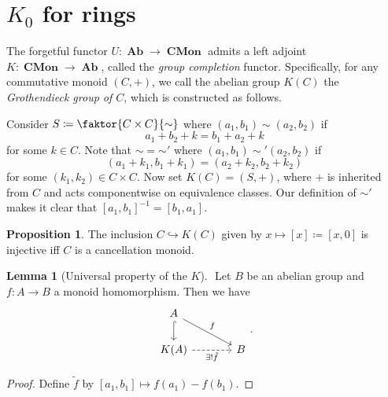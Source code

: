 \documentclass[10pt,letterpaper,cm]{nupset}
\theoremstyle{definition}
\theoremstyle{theorem}
\newtheorem{lemma}[definition]{Lemma}
\newtheorem{prop}[definition]{Proposition}
\theoremstyle{remark}
\newcommand{\1}{\mathbf{1}}
\newcommand{\0}{\vec 0}
\DeclareMathOperator{\Ab}{\mathbf{Ab}}
\DeclareMathOperator{\Cmon}{\mathbf{CMon}}
\begin{document}
\begin{abstract}
We begin low-dimensional $K$-theory, which consists of the groups $K_0(-)$, $K_1(-)$, and $K_2(-)$. Specifically, we describe $K_0$ for rings and for topological spaces. The main sources for this talk are the following.
\begin{itemize}
\item $n$Lab.
\item Charles Weibel's \textit{The $K$-book: an introduction to algebraic $K$-theory}, Chapters I and II.
\item Eric M. Friedlander's \textit{An Introduction to $K$-theory}, Chapter 1.
\end{itemize}
\end{abstract}

\smallskip

\section{$K_0$ for rings}

The forgetful functor $U: \Ab \to \Cmon$ admits a left adjoint $K: \Cmon \to \Ab$, called the \textit{group completion} functor. Specifically, for any commutative monoid $\left(C, +\right)$, we call the abelian group $K(C)$ the \textit{Grothendieck group of $C$}, which is constructed as follows.

\medskip

 Consider $S\coloneqq \faktor{C \times C}{\sim}$ where $(a_1, b_1) \sim (a_2, b_2)$ if $$a_1 + b_2 +k = b_1 + a_2 +k$$ for some $k\in C$. Note that $\sim = {\sim'}$ where $(a_1, b_1) \sim' (a_2, b_2)$ if $$\left(a_1 + k_1, b_1 + k_1\right) = \left(a_2 +k_2, b_2 + k_2\right)$$ for some $\left(k_1, k_2\right) \in C\times C$. Now set $K(C) = \left(S, +\right)$, where $+$ is inherited from $C$ and acts componentwise on equivalence classes. Our definition of ${\sim'}$ makes it clear that $\left[a_1, b_1\right]^{{-1}} = \left[b_1, a_1\right]$.

\begin{prop}
The inclusion $C \hookrightarrow K(C)$ given by $x \mapsto [x]\coloneqq \left[x, 0\right]$ is injective iff $C$ is a cancellation monoid.
\end{prop}

\begin{lemma}[Universal property of the $K$] $ $
Let $B$ be an abelian group and $f: A \to B$ a monoid homomorphism. Then we have 
\[
\begin{tikzcd}[column sep=large]
A \arrow[rd, "f"] \arrow[d, hook] &  \\
K(A) \arrow[swap, r, "\exists! \tilde{f}", dashed] & B
\end{tikzcd}.
\]
\end{lemma}
\begin{proof}
Define $\tilde{f}$ by $[a_1, b_1]\mapsto f(a_1) - f(b_1)$.
\end{proof}
\end{document}
